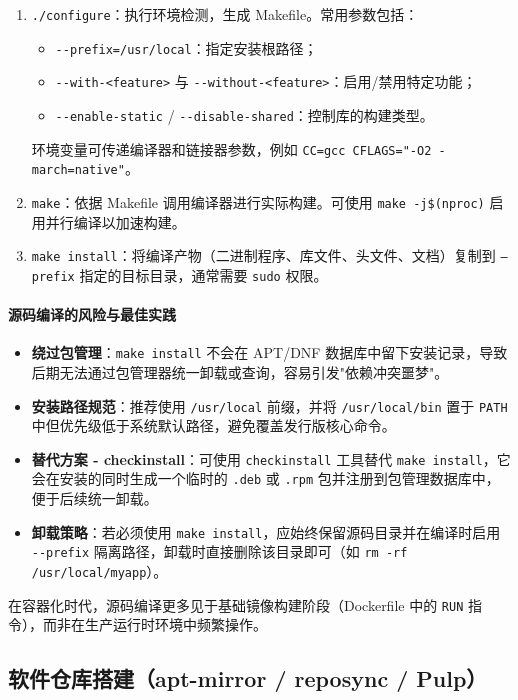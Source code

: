 \documentclass[12pt,UTF8]{ctexbook}
\begin{document}
\begin{enumerate}
	\item \texttt{./configure}：执行环境检测，生成 Makefile。常用参数包括：
	\begin{itemize}
		\item \verb|--prefix=/usr/local|：指定安装根路径；
		\item \verb|--with-<feature>| 与 \verb|--without-<feature>|：启用/禁用特定功能；
		\item \verb|--enable-static| / \verb|--disable-shared|：控制库的构建类型。
	\end{itemize}
	环境变量可传递编译器和链接器参数，例如 \verb|CC=gcc CFLAGS="-O2 -march=native"|。
	
	\item \texttt{make}：依据 Makefile 调用编译器进行实际构建。可使用 \verb|make -j$(nproc)| 启用并行编译以加速构建。
	
	\item \texttt{make install}：将编译产物（二进制程序、库文件、头文件、文档）复制到 \texttt{--prefix} 指定的目标目录，通常需要 \texttt{sudo} 权限。
\end{enumerate}

\paragraph{源码编译的风险与最佳实践}
\begin{itemize}
	\item \textbf{绕过包管理}：\texttt{make install} 不会在 APT/DNF 数据库中留下安装记录，导致后期无法通过包管理器统一卸载或查询，容易引发"依赖冲突噩梦"。
	\item \textbf{安装路径规范}：推荐使用 \texttt{/usr/local} 前缀，并将 \texttt{/usr/local/bin} 置于 \texttt{PATH} 中但优先级低于系统默认路径，避免覆盖发行版核心命令。
	\item \textbf{替代方案 - checkinstall}：可使用 \texttt{checkinstall} 工具替代 \texttt{make install}，它会在安装的同时生成一个临时的 \texttt{.deb} 或 \texttt{.rpm} 包并注册到包管理数据库中，便于后续统一卸载。
	\item \textbf{卸载策略}：若必须使用 \texttt{make install}，应始终保留源码目录并在编译时启用 \verb|--prefix| 隔离路径，卸载时直接删除该目录即可（如 \verb|rm -rf /usr/local/myapp|）。
\end{itemize}

在容器化时代，源码编译更多见于基础镜像构建阶段（Dockerfile 中的 \texttt{RUN} 指令），而非在生产运行时环境中频繁操作。

\subsection{软件仓库搭建（apt-mirror / reposync / Pulp）}
\end{document}
